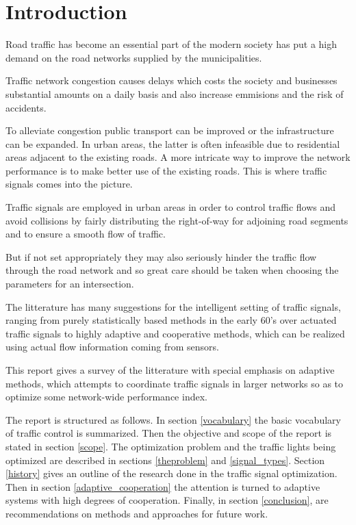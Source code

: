 \section{Introduction}
Road traffic has become an essential part of the modern society has put a high demand on the road networks supplied by the municipalities. 

Traffic network congestion causes delays which costs the society and businesses substantial amounts on a daily basis and also increase emmisions and the risk of accidents.

To alleviate congestion public transport can be improved or the infrastructure can be expanded. In urban areas, the latter is often infeasible due to residential areas adjacent to the existing roads. 
A more intricate way to improve the network performance is to make better use of the existing roads. This is where traffic signals comes into the picture. 

Traffic signals are employed in urban areas in order to control traffic flows and avoid collisions by fairly distributing the right-of-way for adjoining road segments and to ensure a smooth flow of traffic.

But if not set appropriately they may also seriously hinder the traffic flow through the road network and so great care should be taken when choosing the parameters for an intersection. 

The litterature has many suggestions for the intelligent setting of traffic signals, ranging from purely statistically based methods in the early 60's over actuated traffic signals to highly adaptive and cooperative methods, which can be realized using actual flow information coming from sensors. 

This report gives a survey of the litterature with special emphasis on adaptive methods, which attempts to coordinate traffic signals in larger networks so as to optimize some network-wide performance index. 

The report is structured as follows. In section \ref{vocabulary} the basic vocabulary of traffic control is summarized. Then the objective and scope of the report is stated in section \ref{scope}. 
The optimization problem and the traffic lights being optimized are described in sections \ref{theproblem} and \ref{signal_types}.
Section \ref{history} gives an outline of the research done in the traffic signal optimization. Then in section \ref{adaptive_cooperation} the attention is turned to adaptive systems with high degrees of cooperation.
Finally, in section \ref{conclusion}, are recommendations on methods and approaches for future work.